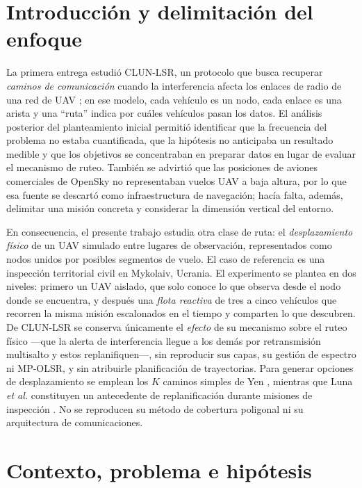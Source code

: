 \documentclass[journal,10pt]{IEEEtran}
\begin{document}
\IEEEpeerreviewmaketitle

\section{Introducción y delimitación del enfoque}

La primera entrega estudió CLUN-LSR, un protocolo que busca recuperar
\emph{caminos de comunicación} cuando la interferencia afecta los enlaces
de radio de una red de UAV \cite{zheng}; en ese modelo, cada vehículo es un
nodo, cada enlace es una arista y una ``ruta'' indica por cuáles vehículos
pasan los datos. El análisis posterior del planteamiento inicial permitió
identificar que la frecuencia del problema no estaba cuantificada, que la
hipótesis no anticipaba un resultado medible y que los objetivos se
concentraban en preparar datos en lugar de evaluar el mecanismo de ruteo.
También se advirtió que las posiciones de aviones comerciales de OpenSky no
representaban vuelos UAV a baja altura, por lo que esa fuente se descartó
como infraestructura de navegación; hacía falta, además, delimitar una
misión concreta y considerar la dimensión vertical del entorno.

En consecuencia, el presente trabajo estudia otra clase de ruta: el
\emph{desplazamiento físico} de un UAV simulado entre lugares de
observación, representados como nodos unidos por posibles segmentos de
vuelo. El caso de referencia es una inspección territorial civil en
Mykolaiv, Ucrania. El experimento se plantea en dos niveles: primero un UAV
aislado, que solo conoce lo que observa desde el nodo donde se encuentra, y
después una \emph{flota reactiva} de tres a cinco vehículos que recorren la
misma misión escalonados en el tiempo y comparten lo que descubren. De
CLUN-LSR se conserva únicamente el \emph{efecto} de su mecanismo sobre el
ruteo físico ---que la alerta de interferencia llegue a los demás por
retransmisión multisalto y estos replanifiquen---, sin reproducir sus capas,
su gestión de espectro ni MP-OLSR, y sin atribuirle planificación de
trayectorias. Para generar opciones de desplazamiento se emplean los $K$
caminos simples de Yen \cite{yen}, mientras que Luna \emph{et al.}
constituyen un antecedente de replanificación durante misiones de
inspección \cite{luna}. No se reproducen su método de cobertura poligonal ni
su arquitectura de comunicaciones.

\section{Contexto, problema e hipótesis}
\end{document}
